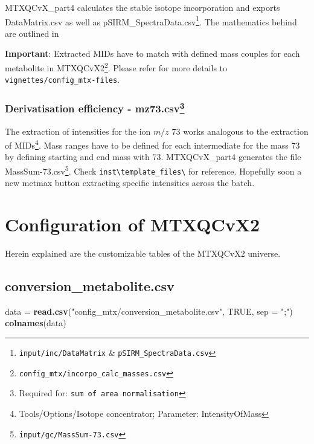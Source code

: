 \documentclass[]{book}
\newenvironment{Shaded}{\begin{snugshade}}{\end{snugshade}}
\newcommand{\KeywordTok}[1]{\textcolor[rgb]{0.13,0.29,0.53}{\textbf{#1}}}
\newcommand{\DataTypeTok}[1]{\textcolor[rgb]{0.13,0.29,0.53}{#1}}
\newcommand{\StringTok}[1]{\textcolor[rgb]{0.31,0.60,0.02}{#1}}
\newcommand{\OtherTok}[1]{\textcolor[rgb]{0.56,0.35,0.01}{#1}}
\newcommand{\NormalTok}[1]{#1}
\let\rmarkdownfootnote\footnote%
\def\footnote{\protect\rmarkdownfootnote}
\theoremstyle{definition}
\theoremstyle{definition}
\theoremstyle{definition}
\theoremstyle{remark}
\begin{document}
MTXQCvX\_part4 calculates the stable isotope incorporation and exports
DataMatrix.csv as well as pSIRM\_SpectraData.csv\footnote{\texttt{input/inc/DataMatrix}
  \& \texttt{pSIRM\_SpectraData.csv}}. The mathematics behind are
outlined in \citep{Pietzke2014}

\textbf{Important}: Extracted MIDs have to match with defined mass
couples for each metabolite in MTXQCvX2\footnote{\texttt{config\_mtx/incorpo\_calc\_masses.csv}}.
Please refer for more details to \texttt{vignettes/config\_mtx-files}.

\subsection[Derivatisation efficiency -
mz73.csv]{\texorpdfstring{Derivatisation efficiency - mz73.csv\footnote{Required
  for: \texttt{sum\ of\ area\ normalisation}}}{Derivatisation efficiency - mz73.csv}}\label{derivatisation-efficiency---mz73.csv}

The extraction of intensities for the ion \(m/z\) 73 works analogous to
the extraction of MIDs\footnote{Tools/Options/Isotope concentrator;
  Parameter: IntensityOfMass}. Mass ranges have to be defined for each
intermediate for the mass 73 by defining starting and end mass with 73.
MTXQCvX\_part4 generates the file MassSum-73.csv\footnote{\texttt{input/gc/MassSum-73.csv}}.
Check \texttt{inst\textbackslash{}template\_files\textbackslash{}} for
reference. Hopefully soon a new metmax button extracting specific
intensities across the batch.

\chapter{Configuration of MTXQCvX2}\label{config}

Herein explained are the customizable tables of the MTXQCvX2 universe.

\section{conversion\_metabolite.csv}\label{conversion_metabolite.csv-1}

\begin{Shaded}
\begin{Highlighting}[]
\NormalTok{data =}\StringTok{ }\KeywordTok{read.csv}\NormalTok{(}\StringTok{"config_mtx/conversion_metabolite.csv"}\NormalTok{, }\OtherTok{TRUE}\NormalTok{, }\DataTypeTok{sep =} \StringTok{";"}\NormalTok{)}
\KeywordTok{colnames}\NormalTok{(data)}
\end{Highlighting}
\end{Shaded}
\end{document}
